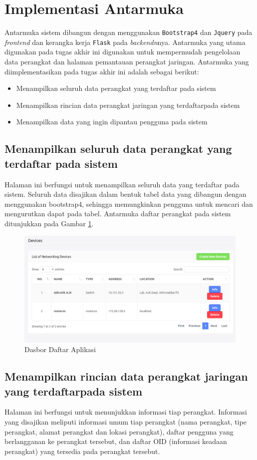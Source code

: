     \section{Implementasi Antarmuka}
    	Antarmuka sistem dibangun dengan menggunakan \texttt{Bootstrap4} dan \texttt{Jquery} pada \textit{frontend} dan kerangka kerja \texttt{Flask} pada \textit{backendn}nya. Antarmuka yang utama digunakan pada tugas akhir ini digunakan untuk mempermudah pengelolaan data perangkat dan halaman pemantauan perangkat jaringan. Antarmuka yang diimplementasikan pada tugas akhir ini adalah sebagai berikut:
    	\begin{itemize}
    		\item Menampilkan seluruh data perangkat yang terdaftar pada sistem
    		\item Menampilkan rincian data perangkat jaringan yang terdaftarpada sistem
    		\item Menampilkan data yang ingin dipantau pengguna pada sistem
    	\end{itemize}
		\subsection{Menampilkan seluruh data perangkat yang terdaftar pada sistem}
        	Halaman ini berfungsi untuk menampilkan seluruh data yang terdaftar pada sistem. Seluruh data disajikan dalam bentuk tabel data yang dibangun dengan menggunakan bootstrap4, sehingga memungkinkan pengguna untuk mencari dan mengurutkan dapat pada tabel. Antarmuka daftar perangkat pada sistem ditunjukkan pada Gambar \ref{antarmuka:daftarperangkat}.
			\begin{figure}[H]
				\centering
				\includegraphics[width=11.2cm]{Images/C-4/antarmukadaftarperangkat.png}
				\caption{Dasbor Daftar Aplikasi}
				\label{antarmuka:daftarperangkat}
			\end{figure}
            
         \subsection{Menampilkan rincian data perangkat jaringan yang terdaftarpada sistem}
         	Halaman ini berfungsi untuk menunjukkan informasi tiap perangkat. Informasi yang disajikan meliputi informasi umum tiap perangkat (nama perangkat, tipe perangkat, alamat perangkat dan lokasi perangkat), daftar pengguna yang berlangganan ke perangkat tersebut, dan daftar OID (informasi keadaan perangkat) yang tersedia pada perangkat tersebut.
         	
